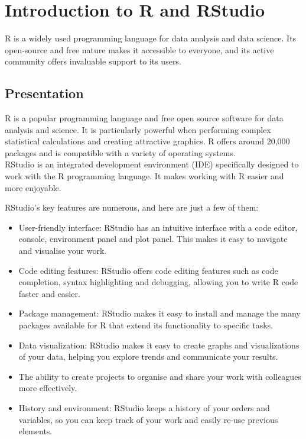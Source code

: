 \documentclass[
]{book}
\providecommand{\tightlist}{%
  \setlength{\itemsep}{0pt}\setlength{\parskip}{0pt}}
\begin{document}
\hypertarget{introduction-to-r-and-rstudio}{%
\chapter{Introduction to R and RStudio}\label{introduction-to-r-and-rstudio}}

R is a widely used programming language for data analysis and data science. Its open-source and free nature makes it accessible to everyone, and its active community offers invaluable support to its users.

\hypertarget{presentation}{%
\section{Presentation}\label{presentation}}

R is a popular programming language and free open source software for data analysis and science. It is particularly powerful when performing complex statistical calculations and creating attractive graphics. R offers around 20,000 packages and is compatible with a variety of operating systems.\\

RStudio is an integrated development environment (IDE) specifically designed to work with the R programming language. It makes working with R easier and more enjoyable.

RStudio's key features are numerous, and here are just a few of them:\\

\begin{itemize}
\tightlist
\item
  User-friendly interface: RStudio has an intuitive interface with a code editor, console, environment panel and plot panel. This makes it easy to navigate and visualise your work.
\item
  Code editing features: RStudio offers code editing features such as code completion, syntax highlighting and debugging, allowing you to write R code faster and easier.
\item
  Package management: RStudio makes it easy to install and manage the many packages available for R that extend its functionality to specific tasks.
\item
  Data visualization: RStudio makes it easy to create graphs and visualizations of your data, helping you explore trends and communicate your results.
\item
  The ability to create projects to organise and share your work with colleagues more effectively.
\item
  History and environment: RStudio keeps a history of your orders and variables, so you can keep track of your work and easily re-use previous elements.
\end{itemize}
\end{document}
